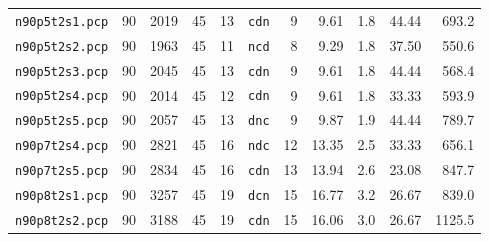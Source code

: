 \documentclass[paper=a4,fontsize=12pt]{scrartcl}
\begin{document}
\begin{table}
\begin{tabular}{c|rrr|r|c|rrr|r|r}
\texttt{n90p5t2s1.pcp} & 90	& 2019	& 45 & 13 & \texttt{cdn} & 9 & 9.61 & 1.8 & 44.44 & 693.2\\
\texttt{n90p5t2s2.pcp} & 90	& 1963	& 45 & 11 & \texttt{ncd} & 8 & 9.29 & 1.8 & 37.50 & 550.6\\
\texttt{n90p5t2s3.pcp} & 90	& 2045	& 45 & 13 & \texttt{cdn} & 9 & 9.61 & 1.8 & 44.44 & 568.4\\
\texttt{n90p5t2s4.pcp} & 90	& 2014	& 45 & 12 & \texttt{cdn} & 9 & 9.61 & 1.8 & 33.33 & 593.9\\
\texttt{n90p5t2s5.pcp} & 90	& 2057	& 45 & 13 & \texttt{dnc} & 9 & 9.87 & 1.9 & 44.44 & 789.7\\
\texttt{n90p7t2s4.pcp} & 90	& 2821	& 45 & 16 & \texttt{ndc} & 12 & 13.35 & 2.5 & 33.33 & 656.1\\
\texttt{n90p7t2s5.pcp} & 90	& 2834	& 45 & 16 & \texttt{cdn} & 13 & 13.94 & 2.6 & 23.08 & 847.7\\
\texttt{n90p8t2s1.pcp} & 90	& 3257	& 45 & 19 & \texttt{dcn} & 15 & 16.77 & 3.2 & 26.67 & 839.0\\
\texttt{n90p8t2s2.pcp} & 90	& 3188	& 45 & 19 & \texttt{cdn} & 15 & 16.06 & 3.0 & 26.67 & 1125.5\\

\end{tabular}
\end{table}
\end{document}
